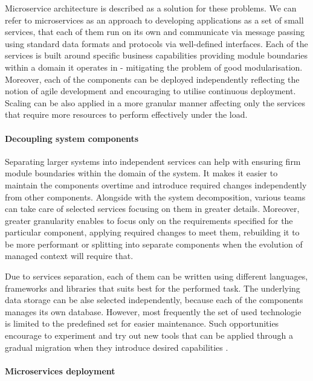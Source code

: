 Microservice architecture is described as a solution for these problems. We can refer to microservices as an approach to developing applications as a set of small services, that each of them run on its own and communicate via message passing using standard data formats and protocols via well-defined interfaces. Each of the services is built around specific business capabilities providing module boundaries within a domain it operates in - mitigating the problem of good modularisation. Moreover, each of the components can be deployed independently reflecting the notion of agile development and encouraging to utilise continuous deployment. Scaling can be also applied in a more granular manner affecting only the services that require more resources to perform effectively under the load. \cite{FowlerMicroservices}

\paragraph{Decoupling system components}

Separating larger systems into independent services can help with ensuring firm module boundaries within the domain of the system. It makes it easier to maintain the components overtime and introduce required changes independently from other components. Alongside with the system decomposition, various teams can take care of selected services focusing on them in greater details. Moreover, greater granularity enables to focus only on the requirements specified for the particular component, applying required changes to meet them, rebuilding it to be more performant or splitting into separate components when the evolution of managed context will require that.

Due to services separation, each of them can be written using different languages, frameworks and libraries that suits best for the performed task. The underlying data storage can be alse selected independently, because each of the components manages its own database. However, most frequently the set of used technologie is limited to the predefined set for easier maintenance. Such opportunities encourage to experiment and try out new tools that can be applied through a gradual migration when they introduce desired capabilities \cite{FowlerMicroservicesTradeoffs}.

\paragraph{Microservices deployment}

